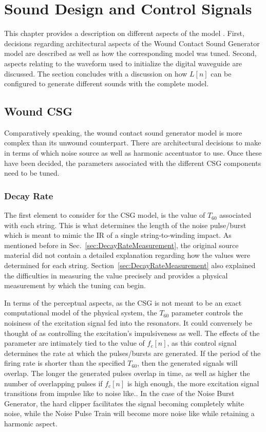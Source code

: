 \documentclass[../main.tex]{subfiles}
\begin{document}
\chapter{Sound Design and Control Signals}
This chapter provides a description on different aspects of the model . First, decisions regarding architectural aspects of the Wound Contact Sound Generator model are described as well as how the corresponding model was tuned. Second, aspects relating to the waveform used to initialize the digital waveguide are discussed. The section concludes with a discussion on how $L[n]$ can be configured to generate different sounds with the complete model.

\section{Wound CSG}
Comparatively speaking, the wound contact sound generator model is more complex than its unwound counterpart. There are architectural decisions to make in terms of which noise source as well as harmonic accentuator to use. Once these have been decided, the parameters associated with the different CSG components need to be tuned.

\subsection{Decay Rate}
The first element to consider for the CSG model, is the value of $T_{60}$ associated with each string. This is what determines the length of the noise pulse/burst which is meant to mimic the IR of a single string-to-winding impact. As mentioned before in Sec.~\ref{sec:DecayRateMeasurement}, the original source material did not contain a detailed explanation regarding how the values were determined for each string. Section~\ref{sec:DecayRateMeasurement} also explained the difficulties in measuring the value precisely and provides a physical measurement by which the tuning can begin.

In terms of the perceptual aspects, as the CSG is not meant to be an exact computational model of the physical system, the $T_{60}$ parameter controls the noisiness of the excitation signal fed into the resonators. It could conversely be thought of as controlling the excitation's impulsiveness as well. The effects of the parameter are intimately tied to the value of $f_c[n]$, as this control signal determines the rate at which the pulses/bursts are generated. If the period of the firing rate is shorter than the specified $T_{60}$, then the generated signals will overlap. The longer the generated pulses overlap in time, as well as higher the number of overlapping pulses if $f_c[n]$ is high enough, the more excitation signal transitions from impulse like to noise like.. In the case of the Noise Burst Generator, the hard clipper facilitates the signal becoming completely white noise, while the Noise Pulse Train will become more noise like while retaining a harmonic aspect. 
\end{document}
